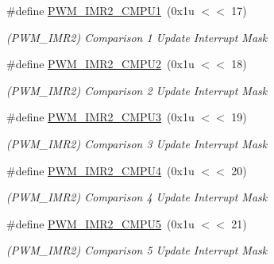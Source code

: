 \begin{DoxyCompactItemize}
\mbox{\label{group__SAMV71__PWM_ga85320c2964e2273799154cbb6df51f85}} 
\#define \mbox{\hyperlink{group__SAMV71__PWM_ga85320c2964e2273799154cbb6df51f85}{P\+W\+M\+\_\+\+I\+M\+R2\+\_\+\+C\+M\+P\+U1}}~(0x1u $<$$<$ 17)
\begin{DoxyCompactList}\small\item\em (P\+W\+M\+\_\+\+I\+M\+R2) Comparison 1 Update Interrupt Mask \end{DoxyCompactList}\item 
\mbox{\label{group__SAMV71__PWM_gaabbf03b3890a7cd9119c68c26c5fbb9a}} 
\#define \mbox{\hyperlink{group__SAMV71__PWM_gaabbf03b3890a7cd9119c68c26c5fbb9a}{P\+W\+M\+\_\+\+I\+M\+R2\+\_\+\+C\+M\+P\+U2}}~(0x1u $<$$<$ 18)
\begin{DoxyCompactList}\small\item\em (P\+W\+M\+\_\+\+I\+M\+R2) Comparison 2 Update Interrupt Mask \end{DoxyCompactList}\item 
\mbox{\label{group__SAMV71__PWM_ga572a55bdb93d2b19940818b363020729}} 
\#define \mbox{\hyperlink{group__SAMV71__PWM_ga572a55bdb93d2b19940818b363020729}{P\+W\+M\+\_\+\+I\+M\+R2\+\_\+\+C\+M\+P\+U3}}~(0x1u $<$$<$ 19)
\begin{DoxyCompactList}\small\item\em (P\+W\+M\+\_\+\+I\+M\+R2) Comparison 3 Update Interrupt Mask \end{DoxyCompactList}\item 
\mbox{\label{group__SAMV71__PWM_ga07e94e5f08d7ededb0365897d87afa87}} 
\#define \mbox{\hyperlink{group__SAMV71__PWM_ga07e94e5f08d7ededb0365897d87afa87}{P\+W\+M\+\_\+\+I\+M\+R2\+\_\+\+C\+M\+P\+U4}}~(0x1u $<$$<$ 20)
\begin{DoxyCompactList}\small\item\em (P\+W\+M\+\_\+\+I\+M\+R2) Comparison 4 Update Interrupt Mask \end{DoxyCompactList}\item 
\mbox{\label{group__SAMV71__PWM_ga633f24c044b3b8358d110b14aba452f5}} 
\#define \mbox{\hyperlink{group__SAMV71__PWM_ga633f24c044b3b8358d110b14aba452f5}{P\+W\+M\+\_\+\+I\+M\+R2\+\_\+\+C\+M\+P\+U5}}~(0x1u $<$$<$ 21)
\begin{DoxyCompactList}\small\item\em (P\+W\+M\+\_\+\+I\+M\+R2) Comparison 5 Update Interrupt Mask \end{DoxyCompactList}\item 
$$
\end{DoxyCompactItemize}
